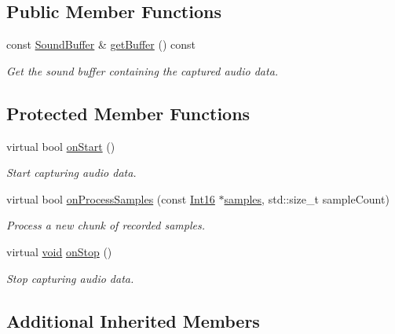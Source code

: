\subsection*{Public Member Functions}
\begin{DoxyCompactItemize}
\item 
const \hyperlink{classsf_1_1_sound_buffer}{Sound\-Buffer} \& \hyperlink{classsf_1_1_sound_buffer_recorder_a84fd636ad22f434bafe2a7c15a8e5107}{get\-Buffer} () const 
\begin{DoxyCompactList}\small\item\em Get the sound buffer containing the captured audio data. \end{DoxyCompactList}\end{DoxyCompactItemize}
\subsection*{Protected Member Functions}
\begin{DoxyCompactItemize}
\item 
virtual bool \hyperlink{classsf_1_1_sound_buffer_recorder_a531a7445fc8a48eaf9fc039c83f17c6f}{on\-Start} ()
\begin{DoxyCompactList}\small\item\em Start capturing audio data. \end{DoxyCompactList}\item 
virtual bool \hyperlink{classsf_1_1_sound_buffer_recorder_a9ceb94de14632ae8c1b78faf603b4767}{on\-Process\-Samples} (const \hyperlink{namespacesf_a3c8e10435e2a310a7741755e66b5c94e}{Int16} $\ast$\hyperlink{gl3_8h_aba70cd077c2c52c15358c231c6d293aa}{samples}, std\-::size\-\_\-t sample\-Count)
\begin{DoxyCompactList}\small\item\em Process a new chunk of recorded samples. \end{DoxyCompactList}\item 
virtual \hyperlink{glutf90_8h_ac778d6f63f1aaf8ebda0ce6ac821b56e}{void} \hyperlink{classsf_1_1_sound_buffer_recorder_ab8e53849312413431873a5869d509f1e}{on\-Stop} ()
\begin{DoxyCompactList}\small\item\em Stop capturing audio data. \end{DoxyCompactList}\end{DoxyCompactItemize}
\subsection*{Additional Inherited Members}


